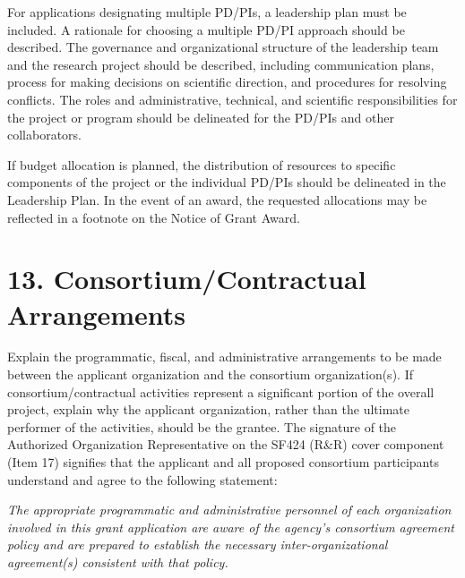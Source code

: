 \documentclass[11pt,notitlepage]{article}
\begin{document}
For applications designating multiple PD/PIs, a leadership plan must be included. A rationale for choosing a multiple PD/PI approach should be described. The governance and organizational structure of the leadership team and the research project should be described, including communication plans, process for making decisions on scientific direction, and procedures for resolving conflicts. The roles and administrative, technical, and scientific responsibilities for the project or program should be delineated for the PD/PIs and other collaborators.

If budget allocation is planned, the distribution of resources to specific components of the project or the individual PD/PIs should be delineated in the Leadership Plan. In the event of an award, the requested allocations may be reflected in a footnote on the Notice of Grant Award.


\newpage

\section*{13. Consortium/Contractual Arrangements}

Explain the programmatic, fiscal, and administrative arrangements to be made between the applicant organization and the consortium organization(s). If consortium/contractual activities represent a significant portion of the overall project, explain why the applicant organization, rather than the ultimate performer of the activities, should be the grantee. The signature of the Authorized Organization Representative on the SF424 (R\&R) cover component (Item 17) signifies that the applicant and all proposed consortium participants understand and agree to the following statement:

\emph{The appropriate programmatic and administrative personnel of each organization involved in this grant application are aware of the agency's consortium agreement policy and are prepared to establish the necessary inter-organizational agreement(s) consistent with that policy.}


\newpage

\end{document}
